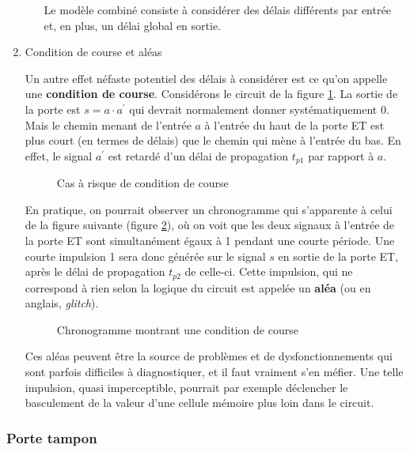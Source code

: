 \documentclass[11pt]{article}
\begin{document}
\begin{enumerate}
\begin{enumerate}
Le modèle combiné consiste à considérer des délais différents par
entrée et, en plus, un délai global en sortie.
\end{enumerate}

\item Condition de course et aléas
\label{sec:orgf7917fa}

Un autre effet néfaste potentiel des délais à considérer est ce qu'on
appelle une \textbf{condition de course}. Considérons le circuit de la figure
\ref{fig:org4105dd0}.  La sortie de la porte est \(s = a \cdot a^\prime\) qui
devrait normalement donner systématiquement 0. Mais le chemin menant
de l'entrée \(a\) à l'entrée du haut de la porte ET est plus court (en
termes de délais) que le chemin qui mène à l'entrée du bas. En effet,
le signal \(a^\prime\) est retardé d'un délai de propagation
\(t_{p1}\) par rapport à \(a\).

\begin{figure}[htbp]
\centering

\caption{\label{fig:org4105dd0}Cas à risque de condition de course}
\end{figure}

En pratique, on pourrait observer un chronogramme qui s'apparente à
celui de la figure suivante (figure \ref{fig:org05212ff}), où on voit
que les deux signaux à l'entrée de la porte ET sont simultanément
égaux à 1 pendant une courte période. Une courte impulsion 1 sera donc
générée sur le signal \(s\) en sortie de la porte ET, après le délai
de propagation \(t_{p2}\) de celle-ci. Cette impulsion, qui ne
correspond à rien selon la logique du circuit est appelée un \textbf{aléa} (ou
en anglais, \emph{glitch}).

\begin{figure}[htbp]
\centering

\caption{\label{fig:org05212ff}Chronogramme montrant une condition de course}
\end{figure}

Ces aléas peuvent être la source de problèmes et de dysfonctionnements
qui sont parfois difficiles à diagnostiquer, et il faut vraiment s'en
méfier. Une telle impulsion, quasi imperceptible, pourrait par exemple
déclencher le basculement de la valeur d'une cellule mémoire plus loin
dans le circuit.
\end{enumerate}

\subsubsection{Porte tampon}
\label{sec:org2e486ca}
\end{document}
